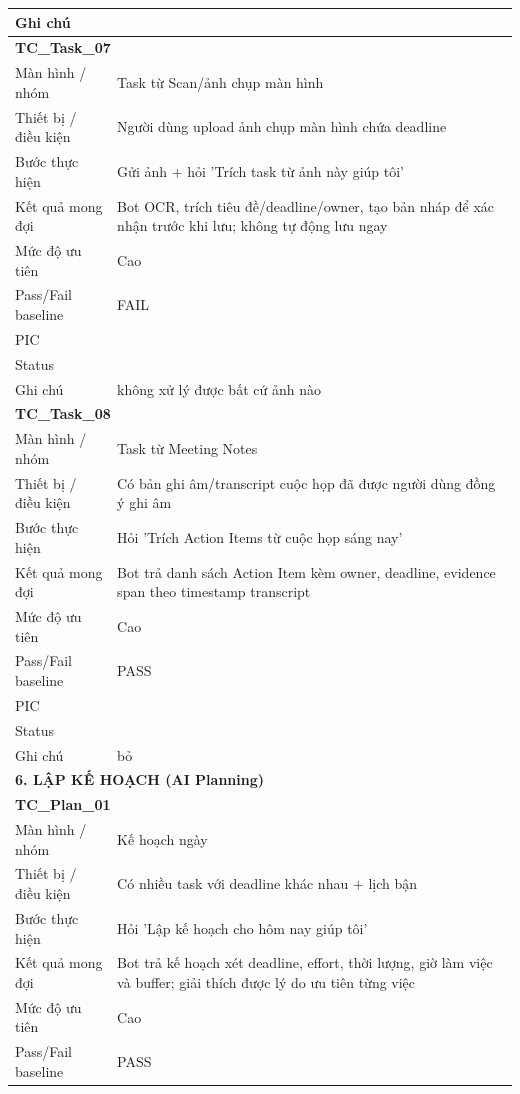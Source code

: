 \documentclass[12pt,a4paper]{article}
\begin{document}
\begin{longtable}{p{3.0cm}p{11.5cm}}
Ghi chú &  \\
\midrule
\multicolumn{2}{l}{\textbf{TC\_Task\_07}} \\
Màn hình / nhóm & Task từ Scan/ảnh chụp màn hình \\
Thiết bị / điều kiện & Người dùng upload ảnh chụp màn hình chứa deadline \\
Bước thực hiện & Gửi ảnh + hỏi 'Trích task từ ảnh này giúp tôi' \\
Kết quả mong đợi & Bot OCR, trích tiêu đề/deadline/owner, tạo bản nháp để xác nhận trước khi lưu; không tự động lưu ngay \\
Mức độ ưu tiên & Cao \\
Pass/Fail baseline & FAIL \\
PIC &  \\
Status &  \\
Ghi chú & không xử lý được bất cứ ảnh nào \\
\midrule
\multicolumn{2}{l}{\textbf{TC\_Task\_08}} \\
Màn hình / nhóm & Task từ Meeting Notes \\
Thiết bị / điều kiện & Có bản ghi âm/transcript cuộc họp đã được người dùng đồng ý ghi âm \\
Bước thực hiện & Hỏi 'Trích Action Items từ cuộc họp sáng nay' \\
Kết quả mong đợi & Bot trả danh sách Action Item kèm owner, deadline, evidence span theo timestamp transcript \\
Mức độ ưu tiên & Cao \\
Pass/Fail baseline & PASS \\
PIC &  \\
Status &  \\
Ghi chú & bỏ \\
\midrule
\multicolumn{2}{l}{\textbf{6. LẬP KẾ HOẠCH (AI Planning)}} \\ \midrule
\multicolumn{2}{l}{\textbf{TC\_Plan\_01}} \\
Màn hình / nhóm & Kế hoạch ngày \\
Thiết bị / điều kiện & Có nhiều task với deadline khác nhau + lịch bận \\
Bước thực hiện & Hỏi 'Lập kế hoạch cho hôm nay giúp tôi' \\
Kết quả mong đợi & Bot trả kế hoạch xét deadline, effort, thời lượng, giờ làm việc và buffer; giải thích được lý do ưu tiên từng việc \\
Mức độ ưu tiên & Cao \\
Pass/Fail baseline & PASS \\

\end{longtable}
\end{document}
